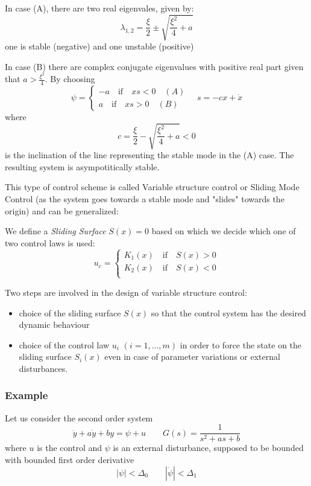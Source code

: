 \documentclass{book}
\begin{document}
In case (A), there are two real eigenvales, given by:
\[
    \lambda_{1,2} = \displaystyle\frac{\xi}{2}\pm \sqrt{\displaystyle\frac{\xi^2}{4}+a}
\]
one is stable (negative) and one unstable (positive)

In case (B) there are complex conjugate eigenvalues with positive real part given that $a>\frac{\xi^2}{4}$. 
By choosing
\[
    \psi = \begin{cases}
        -a \quad \text{if} \quad xs<0 \quad (A)\\
        a \quad \text{if} \quad xs>0 \quad (B)
    \end{cases} \quad s = -cx +\dot{x}
\]
where
\[
    c=\frac{\xi}{2}-\sqrt{\frac{\xi^2}{4}+a}<0
\]
is the inclination of the line representing the stable mode in the (A) case. The resulting system is asympotitically stable.

This type of control scheme is called Variable structure control or Sliding Mode Control (as the system goes towards a stable mode and "slides" towards the origin) and can be generalized:

We define a \emph{Sliding Surface} $S(x)=0$ based on which we decide which one of two control laws is used:
\[
    u_c = \begin{cases}
        K_1(x) \quad \text{if} \quad S(x)>0\\
        K_2(x) \quad \text{if} \quad S(x)<0\\
    \end{cases}
\]

Two steps are involved in the design of variable structure control:
\begin{itemize}
    \item choice of the sliding surface $S(x)$ so that the control system has the desired dynamic behaviour 
    \item choice of the control law $u_i$ $(i=1,\dots,m)$ in order to force the state on the sliding surface $S_i(x)$ even in case of parameter variations or external disturbances. 
\end{itemize}
\subsubsection{Example}
Let us consider the second order system
\[
    \ddot{y} + a\dot{y} + by = \psi +u \qquad G(s) = \displaystyle\frac{1}{s^2+as+b}
\]
where $u$ is the control and $\psi$ is an external disturbance, supposed to be bounded with bounded first order derivative
\[
    |\psi|<\Delta_0 \qquad |\dot{\psi}|<\Delta_1
\]
\end{document}
